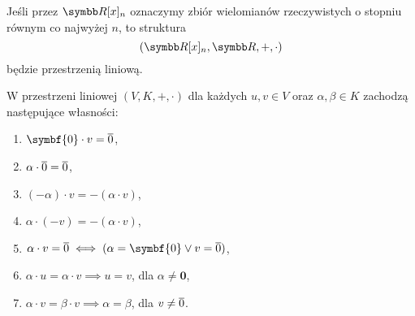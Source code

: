 \begin{example}
    Jeśli przez $\RR[x]_n$ oznaczymy zbiór wielomianów rzeczywistych o stopniu równym co najwyżej $n$, to struktura \[(\RR[x]_n, \RR, +, \cdot)\]
    będzie przestrzenią liniową.
\end{example}

\begin{theorem}
    W przestrzeni liniowej $(V, K, +, \cdot)$ dla każdych $u, v \in V$ oraz $\alpha, \beta \in K$ zachodzą następujące własności:
    \begin{enumerate}
        \item $\symbf{0} \cdot v = \ol{0}$,
        \item $\alpha \cdot \overline{0} = \overline{0}$,
        \item $(-\alpha) \cdot v = - (\alpha \cdot v)$,
        \item $\alpha \cdot (-v) = - (\alpha \cdot v)$,
        \item $\alpha \cdot v = \ol{0} \iff (\alpha = \symbf{0} \lor v = \ol{0})$,
        \item $\alpha \cdot u = \alpha \cdot v \implies u = v$, dla $\alpha \neq \symbf{0}$,
        \item $\alpha \cdot v = \beta \cdot v \implies \alpha = \beta$, dla $v \neq \overline{0}$.
    \end{enumerate}
\end{theorem}
